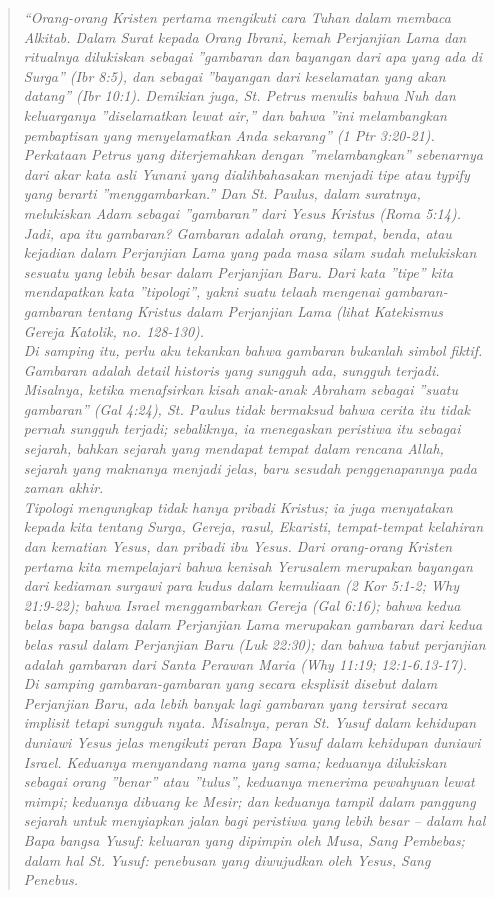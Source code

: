 \begin{quote}\emph{
“Orang-orang Kristen pertama mengikuti cara Tuhan dalam membaca Alkitab. Dalam Surat kepada Orang Ibrani, kemah Perjanjian Lama dan ritualnya dilukiskan sebagai ”gambaran dan bayangan dari apa yang ada di Surga” (Ibr 8:5), dan sebagai ”bayangan dari keselamatan yang akan datang” (Ibr 10:1). Demikian juga, St. Petrus menulis bahwa Nuh dan keluarganya ”diselamatkan lewat air,” dan bahwa ”ini melambangkan pembaptisan yang menyelamatkan Anda sekarang” (1 Ptr 3:20-21).
Perkataan Petrus yang diterjemahkan dengan ”melambangkan” sebenarnya dari akar kata asli Yunani yang dialihbahasakan menjadi tipe atau typify yang berarti ”menggambarkan.” Dan St. Paulus, dalam suratnya, melukiskan Adam sebagai ”gambaran” dari Yesus Kristus (Roma 5:14).
Jadi, apa itu gambaran? Gambaran adalah orang, tempat, benda, atau kejadian dalam Perjanjian Lama yang pada masa silam sudah melukiskan sesuatu yang lebih besar dalam Perjanjian Baru. Dari kata ”tipe” kita mendapatkan kata ”tipologi”, yakni suatu telaah mengenai gambaran-gambaran tentang Kristus dalam Perjanjian Lama (lihat Katekismus Gereja Katolik, no. 128-130).
{~}\\
Di samping itu, perlu aku tekankan bahwa gambaran bukanlah simbol fiktif. Gambaran adalah detail historis yang sungguh ada, sungguh terjadi. Misalnya, ketika menafsirkan kisah anak-anak Abraham sebagai ”suatu gambaran” (Gal 4:24), St. Paulus tidak bermaksud bahwa cerita itu tidak pernah sungguh terjadi; sebaliknya, ia menegaskan peristiwa itu sebagai sejarah, bahkan sejarah yang mendapat tempat dalam rencana Allah, sejarah yang maknanya menjadi jelas, baru sesudah penggenapannya pada zaman akhir.
{~}\\
Tipologi mengungkap tidak hanya pribadi Kristus; ia juga menyatakan kepada kita tentang Surga, Gereja, rasul, Ekaristi, tempat-tempat kelahiran dan kematian Yesus, dan pribadi ibu Yesus. Dari orang-orang Kristen pertama kita mempelajari bahwa kenisah Yerusalem merupakan bayangan dari kediaman surgawi para kudus dalam kemuliaan (2 Kor 5:1-2; Why 21:9-22); bahwa Israel menggambarkan Gereja (Gal 6:16); bahwa kedua belas bapa bangsa dalam Perjanjian Lama merupakan gambaran dari kedua belas rasul dalam Perjanjian Baru (Luk 22:30); dan bahwa tabut perjanjian adalah gambaran dari Santa Perawan Maria (Why 11:19; 12:1-6.13-17).
{~}\\
Di samping gambaran-gambaran yang secara eksplisit disebut dalam Perjanjian Baru, ada lebih banyak lagi gambaran yang tersirat secara implisit tetapi sungguh nyata. Misalnya, peran St. Yusuf dalam kehidupan duniawi Yesus jelas mengikuti peran Bapa Yusuf dalam kehidupan duniawi Israel. Keduanya menyandang nama yang sama; keduanya dilukiskan sebagai orang ”benar” atau ”tulus”, keduanya menerima pewahyuan lewat mimpi; keduanya dibuang ke Mesir; dan keduanya tampil dalam panggung sejarah untuk menyiapkan jalan bagi peristiwa yang lebih besar – dalam hal Bapa bangsa Yusuf: keluaran yang dipimpin oleh Musa, Sang Pembebas; dalam hal St. Yusuf: penebusan yang diwujudkan oleh Yesus, Sang Penebus.
}
\end{quote}
